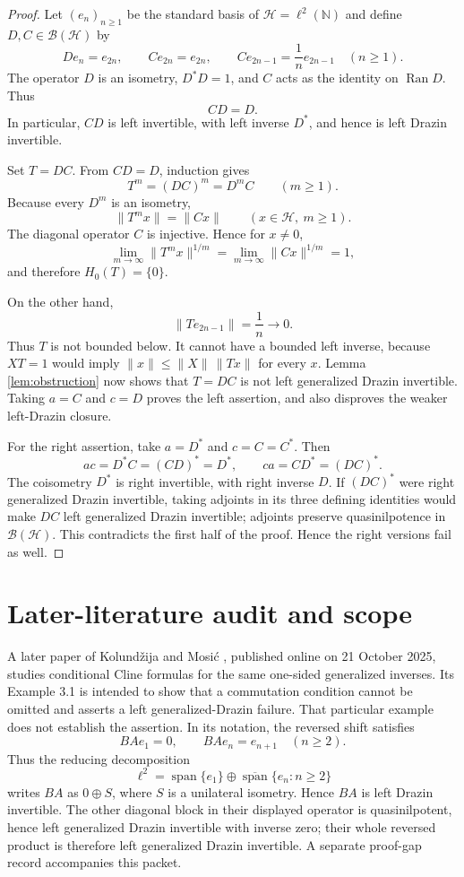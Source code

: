 \documentclass[11pt]{article}
\newcommand{\Hc}{\mathcal H}
\newcommand{\B}{\mathcal B}
\newcommand{\Ran}{\operatorname{Ran}}
\begin{document}
\begin{proof}
Let $(e_n)_{n\ge1}$ be the standard basis of $\Hc=\ell^2(\mathbb N)$ and
define $D,C\in\B(\Hc)$ by
\[
 De_n=e_{2n},\qquad
 Ce_{2n}=e_{2n},\qquad
 Ce_{2n-1}=\frac1n e_{2n-1}\quad(n\ge1).
\]
The operator $D$ is an isometry, $D^*D=1$, and $C$ acts as the identity on
$\Ran D$.  Thus
\[
 CD=D.
\]
In particular, $CD$ is left invertible, with left inverse $D^*$, and hence
is left Drazin invertible.

Set $T=DC$.  From $CD=D$, induction gives
\[
 T^m=(DC)^m=D^mC\qquad(m\ge1).
\]
Because every $D^m$ is an isometry,
\[
 \|T^m x\|=\|Cx\|\qquad(x\in\Hc,\ m\ge1).
\]
The diagonal operator $C$ is injective.  Hence for $x\ne0$,
\[
 \lim_{m\to\infty}\|T^m x\|^{1/m}
 =\lim_{m\to\infty}\|Cx\|^{1/m}=1,
\]
and therefore $H_0(T)=\{0\}$.

On the other hand,
\[
 \|Te_{2n-1}\|=\frac1n\longrightarrow0.
\]
Thus $T$ is not bounded below.  It cannot have a bounded left inverse,
because $XT=1$ would imply
$\|x\|\le\|X\|\,\|Tx\|$ for every $x$.  Lemma \ref{lem:obstruction} now
shows that $T=DC$ is not left generalized Drazin invertible.  Taking
$a=C$ and $c=D$ proves the left assertion, and also disproves the weaker
left-Drazin closure.

For the right assertion, take $a=D^*$ and $c=C=C^*$.  Then
\[
 ac=D^*C=(CD)^*=D^*,
 \qquad ca=CD^*=(DC)^*.
\]
The coisometry $D^*$ is right invertible, with right inverse $D$.  If
$(DC)^*$ were right generalized Drazin invertible, taking adjoints in its
three defining identities would make $DC$ left generalized Drazin
invertible; adjoints preserve quasinilpotence in $\B(\Hc)$.  This
contradicts the first half of the proof.  Hence the right versions fail as
well.
\end{proof}

\section*{Later-literature audit and scope}

A later paper of Kolund\v{z}ija and Mosi\'c \cite{km}, published online on
21 October 2025, studies conditional Cline formulas for the same one-sided
generalized inverses.  Its Example 3.1 is intended to show that a commutation
condition cannot be omitted and asserts a left generalized-Drazin failure.
That particular example does not establish the assertion.  In its notation,
the reversed shift satisfies
\[
 BAe_1=0,\qquad BAe_n=e_{n+1}\quad(n\ge2).
\]
Thus the reducing decomposition
\[
 \ell^2=\operatorname{span}\{e_1\}
 \oplus \overline{\operatorname{span}}\{e_n:n\ge2\}
\]
writes $BA$ as $0\oplus S$, where $S$ is a unilateral isometry.  Hence
$BA$ is left Drazin invertible.  The other diagonal block in their displayed
operator is quasinilpotent, hence left generalized Drazin invertible with
inverse zero; their whole reversed product is therefore left generalized
Drazin invertible.  A separate proof-gap record accompanies this packet.
\end{document}
